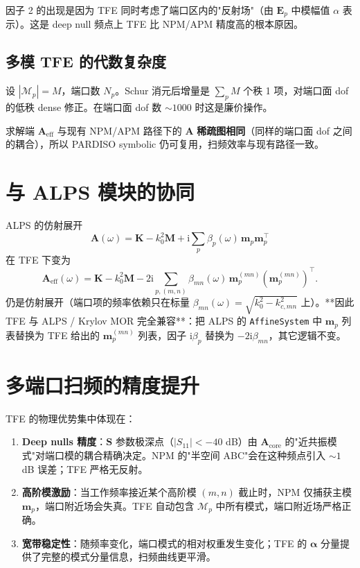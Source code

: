 \documentclass[11pt,a4paper]{ctexart}
\newcommand{\im}{\mathrm{i}}
\begin{document}
因子 2 的出现是因为 TFE 同时考虑了端口区内的"反射场"（由 $\bm E_p$ 中模幅值 $\alpha$ 表示）。这是 deep null 频点上 TFE 比 NPM/APM 精度高的根本原因。

\subsection{多模 TFE 的代数复杂度}

设 $|\mathcal M_p| = M$，端口数 $N_p$。Schur 消元后增量是 $\sum_p M$ 个秩 1 项，对端口面 dof 的低秩 dense 修正。在端口面 dof 数 $\sim 1000$ 时这是廉价操作。

求解端 $\bm A_{\text{eff}}$ 与现有 NPM/APM 路径下的 $\bm A$ \textbf{稀疏图相同}（同样的端口面 dof 之间的耦合），所以 PARDISO symbolic 仍可复用，扫频效率与现有路径一致。

\section{与 ALPS 模块的协同}

ALPS 的仿射展开
\[
  \bm A(\omega) = \bm K - k_0^2 \bm M + \im\sum_p \beta_p(\omega)\,\bm m_p \bm m_p^{\!\top}
\]
在 TFE 下变为
\[
  \bm A_{\text{eff}}(\omega) = \bm K - k_0^2 \bm M - 2\im\sum_{p,(m,n)} \beta_{mn}(\omega)\,\bm m_p^{(mn)} (\bm m_p^{(mn)})^{\!\top}.
\]
仍是仿射展开（端口项的频率依赖只在标量 $\beta_{mn}(\omega) = \sqrt{k_0^2 - k_{c,mn}^2}$ 上）。**因此 TFE 与 ALPS / Krylov MOR 完全兼容**：把 ALPS 的 \texttt{AffineSystem} 中 $\bm m_p$ 列表替换为 TFE 给出的 $\bm m_p^{(mn)}$ 列表，因子 $\im\beta_p$ 替换为 $-2\im\beta_{mn}$，其它逻辑不变。

\section{多端口扫频的精度提升}

TFE 的物理优势集中体现在：

\begin{enumerate}
\item \textbf{Deep nulls 精度}：$\bm S$ 参数极深点（$|S_{11}| < -40$ dB）由 $\bm A_{\text{core}}$ 的"近共振模式"对端口模的耦合精确决定。NPM 的"半空间 ABC"会在这种频点引入 $\sim 1$ dB 误差；TFE 严格无反射。
\item \textbf{高阶模激励}：当工作频率接近某个高阶模 $(m, n)$ 截止时，NPM 仅捕获主模 $\bm m_p$，端口附近场会失真。TFE 自动包含 $\mathcal M_p$ 中所有模式，端口附近场严格正确。
\item \textbf{宽带稳定性}：随频率变化，端口模式的相对权重发生变化；TFE 的 $\bm \alpha$ 分量提供了完整的模式分量信息，扫频曲线更平滑。
\end{enumerate}
\end{document}
